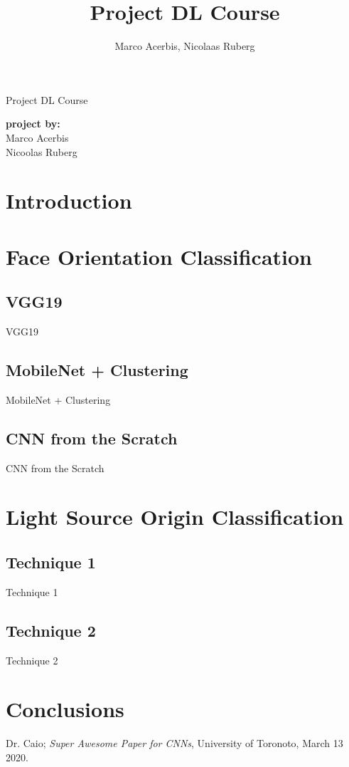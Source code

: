 \documentclass[oneside]{book}
\begin{document}
\begin{titlepage}
\title{Project DL Course}
\author{Marco Acerbis, Nicolaas Ruberg}

\begin{Huge}
\begin{center}
Project DL Course
\end{center}
\end{Huge}

\begin{large}
\begin{minipage}{2in}
\textbf{project by:} \\
Marco Acerbis \\
Nicoolas Ruberg
\end{minipage}
\hfill
\end{large}

\end{titlepage}

\tableofcontents

\chapter*{Introduction}

\chapter{Face Orientation Classification}
\section{VGG19}
VGG19

\section{MobileNet + Clustering}
MobileNet + Clustering

\section{CNN from the Scratch}
CNN from the Scratch

\chapter{Light Source Origin Classification}

\section{Technique 1}
Technique 1

\section{Technique 2}
Technique 2

\chapter{Conclusions}

\begin{thebibliography}{9}
Dr. Caio;
\textit{Super Awesome Paper for CNNs}, University of Toronoto, March 13 2020.

\end{thebibliography}
\end{document}

